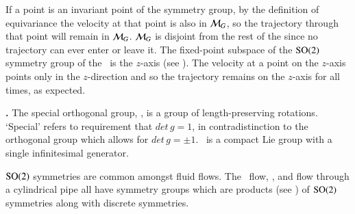If a point is an invariant point of the symmetry group, by the definition of equivariance  the velocity at that point is also in ${\cal M}_{G}$, so the trajectory through that point will remain in ${\cal M}_{G}$. ${\cal M}_{G}$ is disjoint from the rest of the {\statesp} since no trajectory can ever enter or leave it. The fixed-point subspace of the $\textrm{SO}(2)$ symmetry group of the \cLe\ is the $z$-axis (see ). The velocity  at a point on the $z$-axis points only in the $z$-direction and so the trajectory remains on the $z$-axis for all times, as expected.

\begin{definition}
\label{def:SO2}
\textbf{.} The special orthogonal group, , is a group of length-preserving rotations. `Special' refers to requirement that $det \, g = 1$, in contradistinction to the orthogonal group  which allows for $det \, g = \pm 1$. \ is a compact Lie group with a single infinitesimal generator.
\end{definition}

$\textrm{SO}(2)$ symmetries are common amongst fluid flows. The \KS\ flow, {\pCf}, and flow through a cylindrical pipe all have symmetry groups which are products (see ) of $\textrm{SO}(2)$ symmetries along with discrete symmetries.

